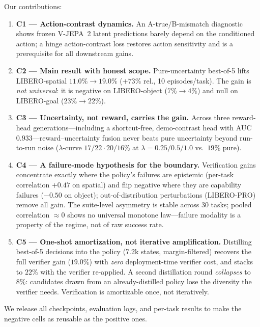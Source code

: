 \documentclass[11pt]{article}
\begin{document}
Our contributions:
\begin{enumerate}
  \item \textbf{C1 --- Action-contrast dynamics.} An A-true/B-mismatch diagnostic shows frozen V-JEPA~2 latent predictions barely depend on the conditioned action; a hinge action-contrast loss restores action sensitivity and is a prerequisite for all downstream gains.
  \item \textbf{C2 --- Main result with honest scope.} Pure-uncertainty best-of-5 lifts LIBERO-spatial $11.0\%\!\to\!19.0\%$ ($+73\%$ rel., 10 episodes/task). The gain is \emph{not universal}: it is negative on LIBERO-object ($7\%\!\to\!4\%$) and null on LIBERO-goal ($23\%\!\to\!22\%$).
  \item \textbf{C3 --- Uncertainty, not reward, carries the gain.} Across three reward-head generations---including a shortcut-free, demo-contrast head with AUC $0.933$---reward--uncertainty fusion never beats pure uncertainty beyond run-to-run noise ($\lambda$-curve $17/22{\cdot}20/16\%$ at $\lambda{=}0.25/0.5/1.0$ vs.\ $19\%$ pure).
  \item \textbf{C4 --- A failure-mode hypothesis for the boundary.} Verification gains concentrate exactly where the policy's failures are epistemic (per-task correlation $+0.47$ on spatial) and flip negative where they are capability failures ($-0.50$ on object); out-of-distribution perturbations (LIBERO-PRO) remove all gain. The suite-level asymmetry is stable across 30 tasks; pooled correlation $\approx 0$ shows no universal monotone law---failure modality is a property of the regime, not of raw success rate.
  \item \textbf{C5 --- One-shot amortization, not iterative amplification.} Distilling best-of-5 decisions into the policy (7.2k states, margin-filtered) recovers the full verifier gain ($19.0\%$) with \emph{zero} deployment-time verifier cost, and stacks to $22\%$ with the verifier re-applied. A second distillation round \emph{collapses} to $8\%$: candidates drawn from an already-distilled policy lose the diversity the verifier needs. Verification is amortizable once, not iteratively.
\end{enumerate}

We release all checkpoints, evaluation logs, and per-task results to make the negative cells as reusable as the positive ones.
\end{document}
